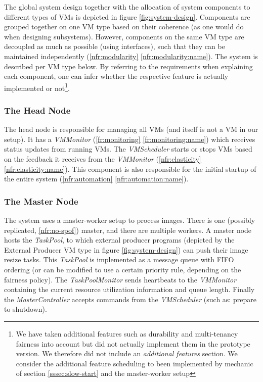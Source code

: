 \documentclass[10pt,journal,compsoc]{IEEEtran}
\def\namedref#1{\ref{#1} \ref{#1:name}}
\begin{document}

The global system design together with the allocation of system components to
different types of VMs is depicted in figure \ref{fig:system-design}.
Components are grouped together on one VM type based on their coherence (as one
would do when designing subsystems). However, components on the same VM type are
decoupled as much as possible (using interfaces), such that they can be
maintained independently (\namedref{nfr:modularity}).
The system is described per VM type below. By referring to the requirements
when explaining each component, one can infer whether the respective feature is
actually implemented or not\footnote{We have taken additional features such as
durability and multi-tenancy fairness into account but did not actually implement them in the prototype
version. We therefore did not include an \emph{additional features} section. We
consider the 
additional feature scheduling to been implemented by mechanic of section \ref{sssec:slow-start} and
the master-worker setup}.

\subsubsection{The Head Node}
\label{sssec:head-node}
The head node is responsible for managing all VMs (and itself is not a VM in our
setup). It has a \emph{VMMonitor} (\namedref{fr:monitoring})
which receives status updates from running VMs. The
\emph{VMScheduler} starts or stops VMs based on the feedback it receives from
the \emph{VMMonitor} (\namedref{nfr:elasticity}). This component is also responsible for the initial startup
of the entire system (\namedref{nfr:automation}).

\subsubsection{The Master Node}
The system uses a master-worker setup to process images. There is one
(possibly replicated, \ref{nfr:no-spof}) master, and there are multiple workers.
A master node hosts the \emph{TaskPool}, to which external producer programs
(depicted by the External Producer VM type in figure \ref{fig:system-design}) can
push their image resize tasks. This \emph{TaskPool} is implemented as a message
queue with FIFO ordering (or can be modified to use a certain priority rule,
depending on the fairness policy). The \emph{TaskPoolMonitor} sends
heartbeats to the \emph{VMMonitor} containing the current
resource utilization information and queue length. Finally the
\emph{MasterController} accepts commands from the \emph{VMScheduler} (such as:
prepare to shutdown).
\end{document}
